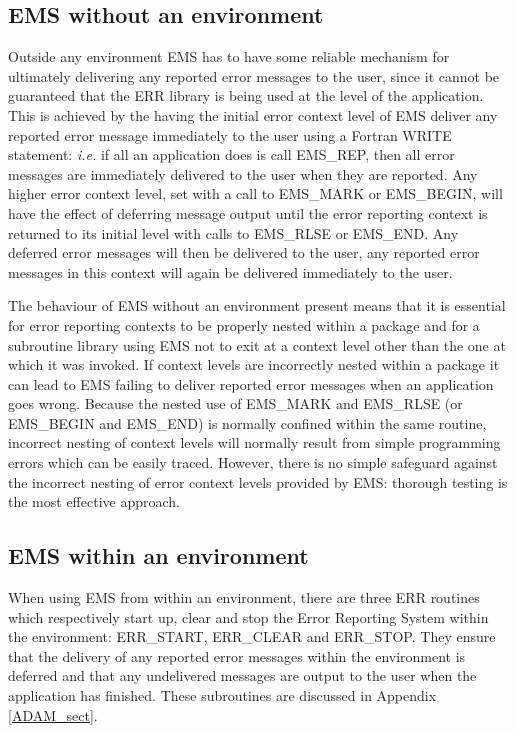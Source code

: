 \subsection {EMS without an environment}

Outside any environment EMS has to have some reliable mechanism for ultimately
delivering any reported error messages to the user, since it cannot be
guaranteed that the ERR library is being used at the level of the application.
This is achieved by the having the initial error context level of EMS deliver 
any reported error message immediately to the user using a Fortran WRITE 
statement: {\em i.e.} if all an application does is call EMS\_REP, then all
error messages are immediately delivered to the user when they are reported.
Any higher error context level, set with a call to EMS\_MARK or EMS\_BEGIN,
will have the effect of deferring message output until the error reporting 
context is returned to its initial level with calls to EMS\_RLSE 
or EMS\_END.
Any deferred error messages will then be delivered to the user, any reported
error messages in this context will again be delivered immediately to the user.

The behaviour of EMS without an environment present means that it is essential
for error reporting contexts to be properly nested within a package and for a
subroutine library using EMS not to exit at a context level other than the
one at which it was invoked.
If context levels are incorrectly nested within a package it can lead to 
EMS failing to deliver reported error messages when an application goes wrong.
Because the nested use of EMS\_MARK and EMS\_RLSE (or EMS\_BEGIN and 
EMS\_END) is normally confined within the same routine, incorrect nesting 
of context levels will normally result from simple programming errors which can
be easily traced.
However, there is no simple safeguard against the incorrect nesting of error
context levels provided by EMS: thorough testing is the most effective
approach.


\subsection {EMS within an environment}

When using EMS from within an environment, there are three ERR routines 
which respectively start up, clear and stop the Error Reporting System within
the environment: ERR\_START, ERR\_CLEAR and ERR\_STOP.
They ensure that the delivery of any reported error messages within the 
environment is deferred and that any undelivered messages are output to the
user when the application has finished.
These subroutines are discussed in Appendix \ref{ADAM_sect}.


